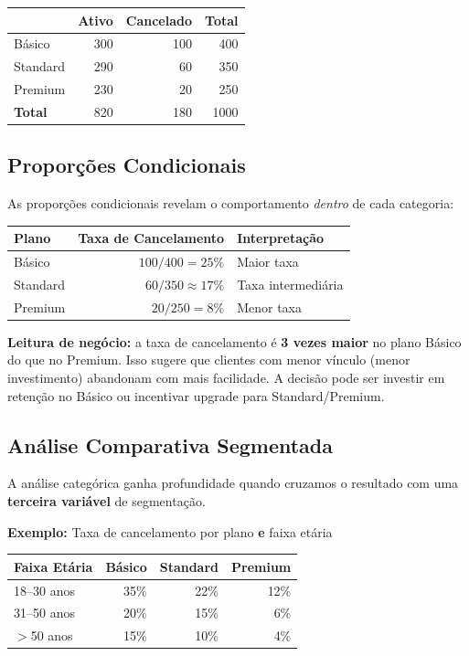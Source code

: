 \begin{center}
\begin{tabular}{|l|r|r|r|}
\hline
& \textbf{Ativo} & \textbf{Cancelado} & \textbf{Total} \\
\hline
Básico   & 300 & 100 & 400 \\
Standard & 290 &  60 & 350 \\
Premium  & 230 &  20 & 250 \\
\hline
\textbf{Total} & 820 & 180 & 1000 \\
\hline
\end{tabular}
\end{center}

\subsection*{Proporções Condicionais}

As proporções condicionais revelam o comportamento \emph{dentro} de cada categoria:

\begin{center}
\begin{tabular}{|l|r|l|}
\hline
\textbf{Plano} & \textbf{Taxa de Cancelamento} & \textbf{Interpretação} \\
\hline
Básico   & $100/400 = 25\%$ & Maior taxa \\
Standard & $60/350 \approx 17\%$ & Taxa intermediária \\
Premium  & $20/250 = 8\%$ & Menor taxa \\
\hline
\end{tabular}
\end{center}

\textbf{Leitura de negócio:} a taxa de cancelamento é \textbf{3 vezes maior} no plano Básico do que no Premium. Isso sugere que clientes com menor vínculo (menor investimento) abandonam com mais facilidade. A decisão pode ser investir em retenção no Básico ou incentivar upgrade para Standard/Premium.

\subsection*{Análise Comparativa Segmentada}

A análise categórica ganha profundidade quando cruzamos o resultado com uma \textbf{terceira variável} de segmentação.

\textbf{Exemplo:} Taxa de cancelamento por plano \textbf{e} faixa etária

\begin{center}
\begin{tabular}{|l|r|r|r|}
\hline
\textbf{Faixa Etária} & \textbf{Básico} & \textbf{Standard} & \textbf{Premium} \\
\hline
18--30 anos & 35\% & 22\% & 12\% \\
31--50 anos & 20\% & 15\% & 6\% \\
$>$50 anos  & 15\% & 10\% & 4\% \\
\hline
\end{tabular}
\end{center}

